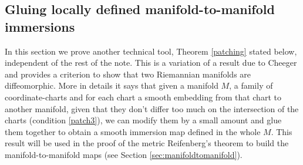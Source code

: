 \documentclass[11pt]{article}
\theoremstyle{plain}
\theoremstyle{definition}
\numberwithin{equation}{section}
\begin{document}
\subsection{Gluing locally defined manifold-to-manifold immersions}\label{sec:cheeger mapping}
In this section we prove another technical tool, Theorem \ref{patching} stated below, independent of the rest of the note.
This is a variation of a result due to Cheeger \cite[Lemma 3.6 and Lemma 4.1]{Cheeger} and provides a criterion to show that two Riemannian manifolds are diffeomorphic. 
More in details it says that given a manifold $M$, a family of coordinate-charts and  for each chart a smooth embedding from that chart to another manifold,  given that they don't differ too much on the intersection of the charts (condition \eqref{patch3}), we can  modify them by a small amount and glue them together to obtain a smooth immersion map defined in the whole $M$.  This result will be used in the proof of the metric Reifenberg's theorem to build the manifold-to-manifold maps  (see Section \ref{sec:manifoldtomanifold}). 
\end{document}
